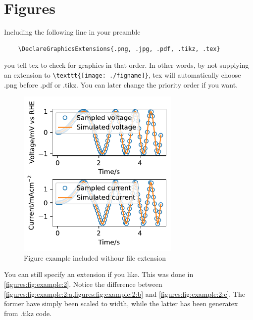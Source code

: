 


    \section{Figures}
    Including the following line in your preamble

    \begin{lstlisting}
    \DeclareGraphicsExtensions{.png, .jpg, .pdf, .tikz, .tex}
    \end{lstlisting}

    you tell tex to check for graphics in that order. In other words, 
    by not supplying an extension to  \lstinline|\texttt{[image: ./figname]}|, tex will automatically choose .png before .pdf or .tikz.
    You can later change the priority order if you want. 



    \begin{figure}[htbp]
        \includegraphics[width=0.7\textwidth]{./figs/example_1}
        \caption{Figure example included withour file extension}
        \label{figures:fig:example:1}
    \end{figure}

    You can still specify an extension if you like. This was done in \cref{figures:fig:example:2}. 
    Notice the difference between \cref{figures:fig:example:2:a,figures:fig:example:2:b} and \cref{figures:fig:example:2:c}.
    The former have simply been scaled to width, while the latter has been generatex from .tikz code.

